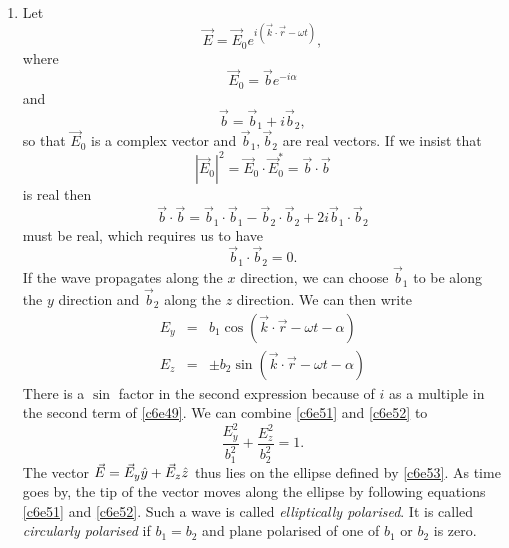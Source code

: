 \begin{enumerate}
\item Let 
\begin{equation}\label{c6e47}
\vec{E} = \vec{E}_0 e^{i(\vec{k}\cdot\vec{r} - \omega t)},
\end{equation}
where
\begin{equation}\label{c6e48}
\vec{E}_0 = \vec{b}e^{-i\alpha}
\end{equation}
and
\begin{equation}\label{c6e49}
\vec{b} = \vec{b}_1 + i\vec{b}_2,
\end{equation}
so that $\vec{E}_0$ is a complex vector and $\vec{b}_1, \vec{b}_2$ are real 
vectors. If we insist that
\[
|\vec{E}_0|^2 = \vec{E}_0\cdot\vec{E}_0^\ast = \vec{b}\cdot\vec{b}
\]
is real then
\[
\vec{b}\cdot\vec{b} = \vec{b}_1\cdot\vec{b}_1 - \vec{b}_2\cdot\vec{b}_2 + 
2i\vec{b}_1\cdot\vec{b}_2
\]
must be real, which requires us to have
\begin{equation}\label{c6e50}
\vec{b}_1\cdot\vec{b}_2 = 0.
\end{equation}
If the wave propagates along the $x$ direction, we can choose $\vec{b}_1$ to be
along the $y$ direction and $\vec{b}_2$ along the $z$ direction. We can then 
write
\begin{eqnarray}
E_y &=& b_1\cos(\vec{k}\cdot\vec{r} - \omega t - \alpha) \label{c6e51} \\
E_z &=& \pm b_2\sin(\vec{k}\cdot\vec{r} - \omega t - \alpha) \label{c6e52}
\end{eqnarray}
There is a $\sin$ factor in the second expression because of $i$ as a multiple
in the second term of \eqref{c6e49}. We can combine \eqref{c6e51} and 
\eqref{c6e52} to
\begin{equation}\label{c6e53}
\frac{E_y^2}{b_1^2} + \frac{E_z^2}{b_2^2} = 1.
\end{equation}
The vector $\vec{E} = \vec{E}_y\hat{y} + \vec{E}_z\hat{z}$ thus lies on the 
ellipse defined by \eqref{c6e53}. As time goes by, the tip of the vector moves 
along the ellipse by following equations \eqref{c6e51} and \eqref{c6e52}. Such 
a wave is called \emph{elliptically polarised}. It is called \emph{circularly 
polarised} if $b_1 = b_2$ and plane polarised of one of $b_1$ or $b_2$ is zero.


\end{enumerate}
